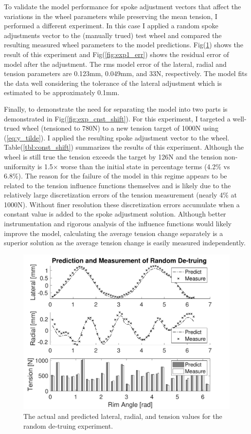 \documentclass[journal]{IEEEtran}
\begin{document}
To validate the model performance for spoke adjustment vectors that affect the variations in the wheel parameters while preserving the mean tension, I performed a different experiment.  In this case I applied a random spoke adjustments vector to the (manually trued) test wheel and compared the resulting measured wheel parameters to the model predictions. Fig(\ref{fig:exp1}) shows the result of this experiment and Fig(\ref{fig:exp1_err}) shows the residual error of model after the adjustment. The rms model error of the lateral, radial and tension parameters are 0.123mm, 0.049mm, and 33N, respectively.  The model fits the data well considering the tolerance of the lateral adjustment which is estimated to be approximately 0.1mm.

Finally, to demonstrate the need for separating the model into two parts is demonstrated in Fig(\ref{fig:exp_cnst_shift}).  For this experiment, I targeted a well-trued wheel (tensioned to 780N) to a new tension target of 1000N using (\ref{eq:y_tilde}).  I applied the resulting spoke adjustment vector to the wheel.  Table(\ref{tbl:const_shift}) summarizes the results of this experiment. Although the wheel is still true the tension exceeds the target by 126N and the tension non-uniformity is 1.5$\times$ worse than the initial state in percentage terms (4.2\% vs 6.8\%). The reason for the failure of the model in this regime appears to be related to the tension influence functions themselves and is likely due to the relatively large discretization errors of the tension measurement (nearly 4\% at 1000N).  Without finer resolution these discretization errors accumulate when a constant value is added to the spoke adjustment solution.  Although better instrumentation and rigorous analysis of the influence functions would likely improve the model, calculating the average tension change separately is a superior solution as the average tension change is easily measured independently. 

\begin{figure}[!t]
\centering
\includegraphics[width=3.25 in]{./figs/exp1} %
\caption{The actual and predicted lateral, radial, and tension values for the random de-truing experiment.}
\label{fig:exp1}
\end{figure}
\end{document}
